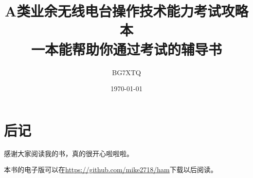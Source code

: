 \documentclass[UTF8]{ctexbook}
\title{A类业余无线电台操作技术能力考试攻略本\\\large 一本能帮助你通过考试的辅导书} %
\author{BG7XTQ} %
\date{\today}   %
\begin{document}

\maketitle%
\tableofcontents%







\chapter*{后记}

感谢大家阅读我的书，真的很开心啦啦啦。

本书的电子版可以在\url{https://github.com/mike2718/ham}下载以后阅读。

\end{document}
